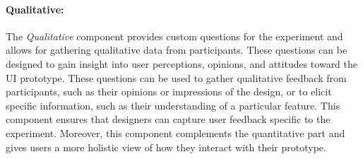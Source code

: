 \paragraph{Qualitative:}
The \textit{Qualitative} component provides custom questions for the experiment and allows for gathering qualitative data from participants. 
These questions can be designed to gain insight into user perceptions, opinions, and attitudes toward the UI prototype.
These questions can be used to gather qualitative feedback from participants, such as their opinions or impressions of the design, or to elicit specific information, such as their understanding of a particular feature. 
This component ensures that designers can capture user feedback specific to the experiment.
Moreover, this component complements the quantitative part and gives users a more holistic view of how they interact with their prototype.


